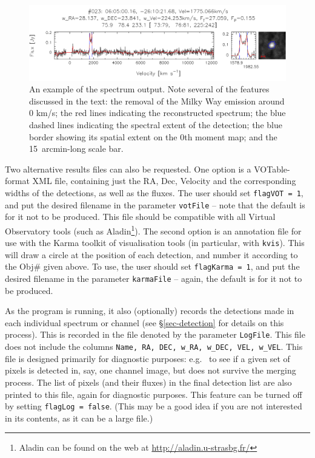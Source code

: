 \documentclass[12pt,a4paper]{article}
\newcommand{\eg}{e.g.\ }
\begin{document}
\begin{figure}[t]
\begin{center}
\includegraphics[width=\textwidth]{example_spectrum}
\end{center}
\caption{\footnotesize An example of the spectrum output. Note several
  of the features discussed in the text: the removal of the Milky Way
  emission around 0 km/s; the red lines indicating the reconstructed
  spectrum; the blue dashed lines indicating the spectral extent of
  the detection; the blue border showing its spatial extent on the
  0th moment map; and the 15~arcmin-long scale bar.}
\label{fig-spect}
\end{figure}

Two alternative results files can also be requested. One option is a
VOTable-format XML file, containing just the RA, Dec, Velocity and the
corresponding widths of the detections, as well as the fluxes. The
user should set {\tt flagVOT = 1}, and put the desired filename in the
parameter {\tt votFile} -- note that the default is for it not to be
produced. This file should be compatible with all Virtual Observatory
tools (such as Aladin\footnote{ Aladin can be found on the web at
\href{http://aladin.u-strasbg.fr/}{http://aladin.u-strasbg.fr/}}). The
second option is an annotation file for use with the Karma toolkit of
visualisation tools (in particular, with {\tt kvis}). This will draw a
circle at the position of each detection, and number it according to
the Obj\# given above. To use, the user should set {\tt flagKarma = 1},
and put the desired filename in the parameter {\tt karmaFile} -- again,
the default is for it not to be produced.

As the program is running, it also (optionally) records the detections
made in each individual spectrum or channel (see
\S\ref{sec-detection} for details on this process). This is
recorded in the file denoted by the parameter {\tt LogFile}. This file
does not include the columns {\tt Name, RA, DEC, w\_RA, w\_DEC, VEL,
w\_VEL}. This file is designed primarily for diagnostic purposes: \eg
to see if a given set of pixels is detected in, say, one channel
image, but does not survive the merging process. The list of pixels
(and their fluxes) in the final detection list are also printed to
this file, again for diagnostic purposes. This feature can be turned
off by setting {\tt flagLog = false}. (This may be a good idea if you
are not interested in its contents, as it can be a large file.)
\end{document}
